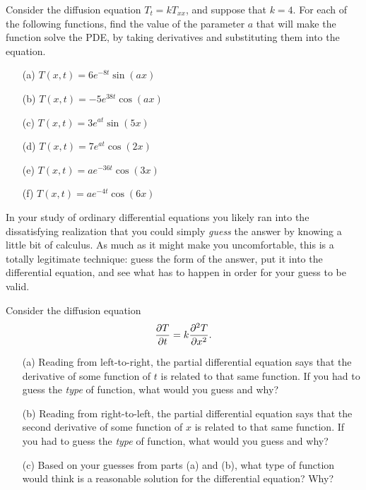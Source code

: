 \begin{problem}
    Consider the diffusion equation $T_t = k T_{xx}$, and suppose that $k=4$.  For each of
    the following functions, find the value of the parameter $a$ that will make the
    function solve the PDE, by taking derivatives and substituting them into the equation.

    \begin{enumerate}
        \item[(a)] $T(x,t) = 6 e^{-8 t} \sin(ax)$  %
        \item[(b)] $T(x,t) = -5 e^{38 t} \cos(ax)$ 
        \item[(c)] $T(x,t) = 3 e^{at} \sin(5 x)$  
        \item[(d)] $T(x,t) = 7 e^{at} \cos(2 x)$  
        \item[(e)] $T(x,t) = a e^{-36t} \cos(3 x)$  
        \item[(f)] $T(x,t) = a e^{-4t} \cos(6 x)$  %
    \end{enumerate}
\end{problem}

In your study of ordinary differential equations you likely ran into the dissatisfying
realization that you could simply {\it guess} the answer by knowing a little bit of
calculus.  As much as it might make you uncomfortable, this is a totally legitimate
technique: guess the form of the answer, put it into the differential equation, and see
what has to happen in order for your guess to be valid.  

\begin{problem}
    Consider the diffusion equation 
    \[ \frac{\partial{T}}{\partial{t}} = k \frac{\partial^2{T}}{\partial{x}^2}. \]
    \begin{enumerate}
        \item[(a)] Reading from left-to-right, the partial differential equation says that
            the derivative of some function of $t$ is related to that same function.  If
            you had to guess the {\it type} of function, what would you guess and why?
        \item[(b)] Reading from right-to-left, the partial differential equation says that
            the second derivative of some function of $x$ is related to that same
            function.  If you had to guess the {\it type} of function, what would you
            guess and why?
        \item[(c)] Based on your guesses from parts (a) and (b), what type of function
            would think is a reasonable solution for the differential equation?  Why?
    \end{enumerate}
\end{problem}


